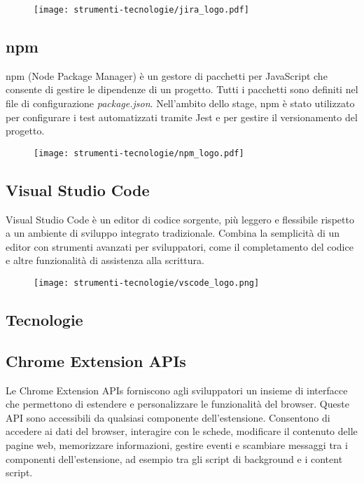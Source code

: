 \begin{figure}[H]
    \centering 
    \texttt{[image: strumenti-tecnologie/jira\_logo.pdf]} 
\end{figure}

\subsection*{npm}

\par npm (Node Package Manager) è un gestore di pacchetti per JavaScript che consente di gestire le dipendenze di un progetto. Tutti i pacchetti sono definiti nel file di configurazione \textit{package.json}. Nell’ambito dello stage, npm è stato utilizzato per configurare i test automatizzati tramite Jest e per gestire il versionamento del progetto.

\begin{figure}[H]
    \centering 
    \texttt{[image: strumenti-tecnologie/npm\_logo.pdf]} 
\end{figure}

\subsection*{Visual Studio Code}

\par Visual Studio Code è un editor di codice sorgente, più leggero e flessibile rispetto a un ambiente di sviluppo integrato tradizionale. Combina la semplicità di un editor con strumenti avanzati per sviluppatori, come il completamento del codice e altre funzionalità di assistenza alla scrittura.

\begin{figure}[H]
    \centering 
    \texttt{[image: strumenti-tecnologie/vscode\_logo.png]} 
\end{figure}

\subsection{Tecnologie}

\subsection*{Chrome Extension APIs}

\par Le Chrome Extension APIs forniscono agli sviluppatori un insieme di interfacce che permettono di estendere e personalizzare le funzionalità del browser. Queste API sono accessibili da qualsiasi componente dell’estensione. Consentono di accedere ai dati del browser, interagire con le schede, modificare il contenuto delle pagine web, memorizzare informazioni, gestire eventi e scambiare messaggi tra i componenti dell’estensione, ad esempio tra gli script di background e i content script.

